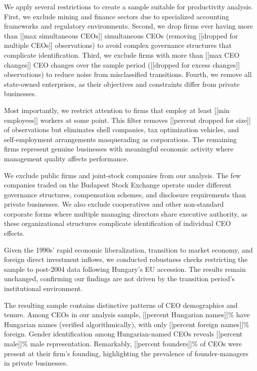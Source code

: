 \documentclass[11pt,a4paper]{article}
\begin{document}
We apply several restrictions to create a sample suitable for productivity analysis. First, we exclude mining and finance sectors due to specialized accounting frameworks and regulatory environments. Second, we drop firms ever having more than [[max simultaneous CEOs]] simultaneous CEOs (removing [[dropped for multiple CEOs]] observations) to avoid complex governance structures that complicate identification. Third, we exclude firms with more than [[max CEO changes]] CEO changes over the sample period ([[dropped for excess changes]] observations) to reduce noise from misclassified transitions. Fourth, we remove all state-owned enterprises, as their objectives and constraints differ from private businesses.

Most importantly, we restrict attention to firms that employ at least [[min employees]] workers at some point. This filter removes [[percent dropped for size]] of observations but eliminates shell companies, tax optimization vehicles, and self-employment arrangements masquerading as corporations. The remaining firms represent genuine businesses with meaningful economic activity where management quality affects performance.

We exclude public firms and joint-stock companies from our analysis. The few companies traded on the Budapest Stock Exchange operate under different governance structures, compensation schemes, and disclosure requirements than private businesses. We also exclude cooperatives and other non-standard corporate forms where multiple managing directors share executive authority, as these organizational structures complicate identification of individual CEO effects.



Given the 1990s' rapid economic liberalization, transition to market economy, and foreign direct investment inflows, we conducted robustness checks restricting the sample to post-2004 data following Hungary's EU accession. The results remain unchanged, confirming our findings are not driven by the transition period's institutional environment.

The resulting sample contains distinctive patterns of CEO demographics and tenure. Among CEOs in our analysis sample, [[percent Hungarian names]]\% have Hungarian names (verified algorithmically), with only [[percent foreign names]]\% foreign. Gender identification among Hungarian-named CEOs reveals [[percent male]]\% male representation. Remarkably, [[percent founders]]\% of CEOs were present at their firm's founding, highlighting the prevalence of founder-managers in private businesses.
\end{document}
